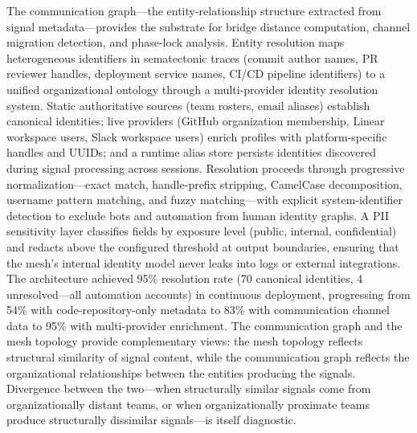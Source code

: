 \documentclass[11pt,a4paper]{article}
\begin{document}
The communication graph---the entity-relationship structure extracted from signal metadata---provides the substrate for bridge distance computation, channel migration detection, and phase-lock analysis. Entity resolution maps heterogeneous identifiers in sematectonic traces (commit author names, PR reviewer handles, deployment service names, CI/CD pipeline identifiers) to a unified organizational ontology through a multi-provider identity resolution system. Static authoritative sources (team rosters, email aliases) establish canonical identities; live providers (GitHub organization membership, Linear workspace users, Slack workspace users) enrich profiles with platform-specific handles and UUIDs; and a runtime alias store persists identities discovered during signal processing across sessions. Resolution proceeds through progressive normalization---exact match, handle-prefix stripping, CamelCase decomposition, username pattern matching, and fuzzy matching---with explicit system-identifier detection to exclude bots and automation from human identity graphs. A PII sensitivity layer classifies fields by exposure level (public, internal, confidential) and redacts above the configured threshold at output boundaries, ensuring that the mesh's internal identity model never leaks into logs or external integrations. The architecture achieved 95\% resolution rate (70 canonical identities, 4 unresolved---all automation accounts) in continuous deployment, progressing from 54\% with code-repository-only metadata to 83\% with communication channel data to 95\% with multi-provider enrichment. The communication graph and the mesh topology provide complementary views: the mesh topology reflects structural similarity of signal content, while the communication graph reflects the organizational relationships between the entities producing the signals. Divergence between the two---when structurally similar signals come from organizationally distant teams, or when organizationally proximate teams produce structurally dissimilar signals---is itself diagnostic.
\end{document}
